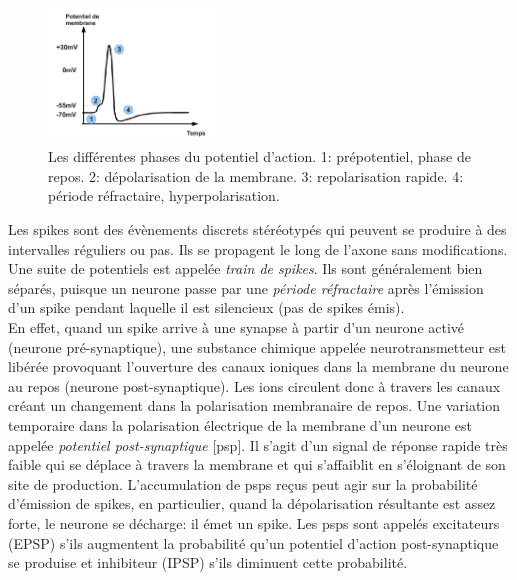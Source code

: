 \begin{figure}[htbp]
\begin{center}
\includegraphics[width=0.4\textwidth]{figures/ch1_2_potentiel}
\end{center}
\caption{Les différentes phases du potentiel d'action. 1: prépotentiel, phase de repos. 2: dépolarisation de la membrane. 3: repolarisation rapide. 4: période réfractaire, hyperpolarisation.}
\label{potentiel}
\end{figure}

Les spikes sont des évènements discrets stéréotypés qui peuvent se produire à des intervalles réguliers ou pas. Ils se propagent le long de l'axone sans modifications. Une suite de potentiels est appelée \textit{train de spikes}. Ils sont généralement bien séparés, puisque un neurone passe par une \textit{période réfractaire} après l'émission d'un spike pendant laquelle il est silencieux (pas de spikes émis). \\

En effet, quand un spike arrive à une synapse à partir d'un neurone activé (neurone pré-synaptique), une substance chimique appelée neurotransmetteur est libérée provoquant l'ouverture des canaux ioniques dans la membrane du neurone au repos (neurone post-synaptique). Les ions circulent donc à travers les canaux créant un changement dans la polarisation membranaire de repos. Une variation temporaire dans la polarisation électrique de la membrane d'un neurone est appelée \textit{potentiel post-synaptique} [\gls{psp}]. Il s'agit d'un signal de réponse rapide très faible qui se déplace à travers la membrane et qui s'affaiblit en s'éloignant de son site de production. L'accumulation de \glspl{psp} reçus peut agir sur la probabilité d'émission de spikes, en particulier, quand la dépolarisation résultante est assez forte, le neurone se décharge: il émet un spike. Les \glspl{psp} sont appelés excitateurs (EPSP) s'ils augmentent la probabilité qu'un potentiel d'action post-synaptique se produise et inhibiteur (IPSP) s'ils diminuent cette probabilité.\\

